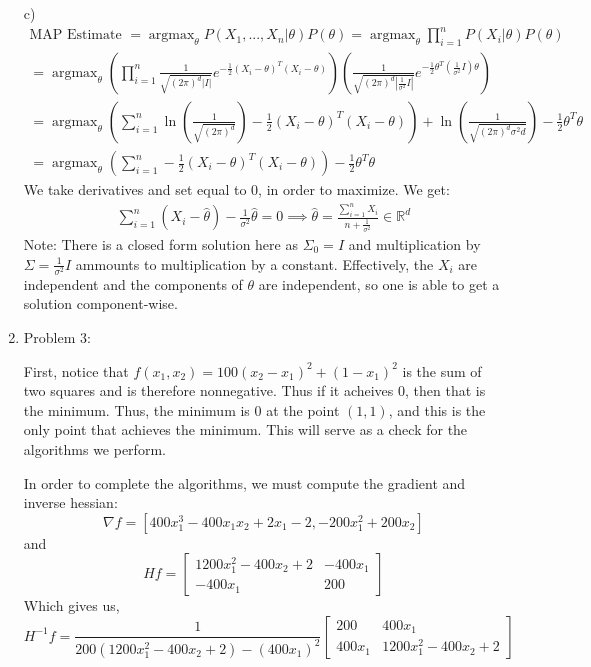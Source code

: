 \documentclass[12pt]{article}
\theoremstyle{plain}
\theoremstyle{definition}
\DeclareMathOperator{\argmax}{argmax}
\begin{document}
\begin{enumerate}
\vspace{15pc}
c) 
\begin{align*}
\text{MAP Estimate } = \argmax_{\theta} P(X_1, ..., X_n | \theta)P(\theta) = \argmax_{\theta} \prod_{i=1}^n P(X_i|\theta)P(\theta) \\
= \argmax_{\theta} (\prod_{i=1}^n \frac{1}{\sqrt{(2\pi)^d |I|}} e^{-\frac{1}{2} (X_i-\theta)^T(X_i - \theta)}) (\frac{1}{\sqrt{(2\pi)^d |\frac{1}{\sigma^2}I|}} e^{-\frac{1}{2}\theta^T (\frac{1}{\sigma^2} I) \theta}) \\
= \argmax_{\theta} (\sum_{i=1}^n \ln(\frac{1}{\sqrt{(2\pi)^d}}) - \frac{1}{2}(X_i - \theta)^T(X_i - \theta)) + \ln(\frac{1}{\sqrt{(2\pi)^d \sigma^2 d}}) - \frac{1}{2} \theta^T \theta \\
= \argmax_{\theta} (\sum_{i=1}^n - \frac{1}{2}(X_i - \theta)^T(X_i - \theta))  - \frac{1}{2} \theta^T \theta 
\end{align*}
We take derivatives and set equal to 0, in order to maximize. We get:
\begin{align*}
\sum_{i=1}^n (X_i - \hat \theta) - \frac{1}{\sigma^2}\hat \theta = 0 \implies \hat\theta = \frac{\sum_{i=1}^n X_i}{n + \frac{1}{\sigma^2}} \in \mathbb{R}^d
\end{align*}
Note: There is a closed form solution here as $\Sigma_0 = I$ and multiplication by $\Sigma = \frac{1}{\sigma^2}I$ ammounts to multiplication by a constant. Effectively, the $X_i$ are independent and the components of $\theta$ are independent, so one is able to get a solution component-wise. 

\vspace{30pc}

\item
Problem 3: 

First, notice that $f(x_1, x_2) = 100(x_2 - x_1)^2 + (1-x_1)^2$ is the sum of two squares and is therefore nonnegative. Thus if it acheives 0, then that is the minimum. Thus, the minimum is $0$ at the point $(1,1)$, and this is the only point that achieves the minimum. This will serve as a check for the algorithms we perform. 

In order to complete the algorithms, we must compute the gradient and inverse hessian:
$$ \nabla f = [400x_1^3 - 400x_1x_2 + 2x_1 - 2, -200x_1^2 + 200x_2] $$
and
$$ Hf = 
\begin{bmatrix}
1200x_1^2-400x_2+2 & -400x_1 \\
-400x_1			   & 200
\end{bmatrix}
$$
Which gives us,
$$ H^{-1}f = \frac{1}{200(1200x_1^2 - 400x_2 + 2) - (400x_1)^2}
\begin{bmatrix}
200     & 400x_1 \\
400x_1  & 1200x_1^2-400x_2+2 
\end{bmatrix}
$$


\end{enumerate}
\end{document}
